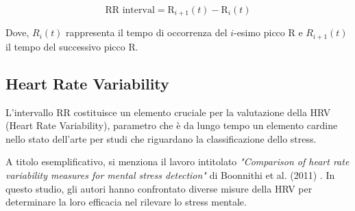 \begin{equation}
    \boxed{
    \text{RR interval} = \text{R}_{i+1}(t) - \text{R}_i(t)
    }
    \label{eq:3-2}
\end{equation}

\bigskip

Dove, $R_i(t)$ rappresenta il tempo di occorrenza del $i$-esimo picco R e $R_{i+1}(t)$ il tempo del successivo picco R.

\subsection{Heart Rate Variability}

L'intervallo RR costituisce un elemento cruciale per la valutazione della HRV (Heart Rate Variability), parametro che è da lungo tempo un elemento cardine nello stato dell'arte per studi che riguardano la classificazione dello stress.

\bigskip

A titolo esemplificativo, si menziona il lavoro intitolato \textit{"Comparison of heart rate variability measures for mental stress detection"} di Boonnithi et al. (2011) \cite{boonnithi2011comparison}. In questo studio, gli autori hanno confrontato diverse misure della HRV per determinare la loro efficacia nel rilevare lo stress mentale.